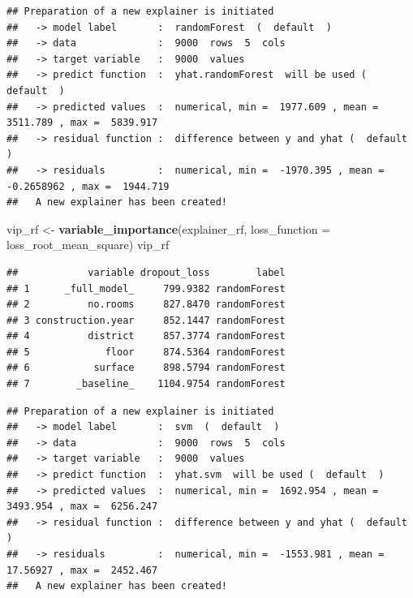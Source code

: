 \documentclass[12pt,]{krantz}
\newenvironment{Shaded}{\begin{snugshade}}{\end{snugshade}}
\newcommand{\DataTypeTok}[1]{\textcolor[rgb]{0.13,0.29,0.53}{#1}}
\newcommand{\DecValTok}[1]{\textcolor[rgb]{0.00,0.00,0.81}{#1}}
\newcommand{\KeywordTok}[1]{\textcolor[rgb]{0.13,0.29,0.53}{\textbf{#1}}}
\newcommand{\NormalTok}[1]{#1}
\newcommand{\OperatorTok}[1]{\textcolor[rgb]{0.81,0.36,0.00}{\textbf{#1}}}
\newcommand{\OtherTok}[1]{\textcolor[rgb]{0.56,0.35,0.01}{#1}}
\newcommand{\StringTok}[1]{\textcolor[rgb]{0.31,0.60,0.02}{#1}}
\begin{document}
\begin{verbatim}
## Preparation of a new explainer is initiated
##   -> model label       :  randomForest  (  default  )
##   -> data              :  9000  rows  5  cols 
##   -> target variable   :  9000  values 
##   -> predict function  :  yhat.randomForest  will be used (  default  )
##   -> predicted values  :  numerical, min =  1977.609 , mean =  3511.789 , max =  5839.917  
##   -> residual function :  difference between y and yhat (  default  )
##   -> residuals         :  numerical, min =  -1970.395 , mean =  -0.2658962 , max =  1944.719  
##   A new explainer has been created!
\end{verbatim}

\begin{Shaded}
\begin{Highlighting}[]
\NormalTok{vip_rf <-}\StringTok{ }\KeywordTok{variable_importance}\NormalTok{(explainer_rf, }
            \DataTypeTok{loss_function =}\NormalTok{ loss_root_mean_square)}
\NormalTok{vip_rf}
\end{Highlighting}
\end{Shaded}

\begin{verbatim}
##            variable dropout_loss        label
## 1      _full_model_     799.9382 randomForest
## 2          no.rooms     827.8470 randomForest
## 3 construction.year     852.1447 randomForest
## 4          district     857.3774 randomForest
## 5             floor     874.5364 randomForest
## 6           surface     898.5794 randomForest
## 7        _baseline_    1104.9754 randomForest
\end{verbatim}

\begin{Shaded}
\end{Shaded}

\begin{verbatim}
## Preparation of a new explainer is initiated
##   -> model label       :  svm  (  default  )
##   -> data              :  9000  rows  5  cols 
##   -> target variable   :  9000  values 
##   -> predict function  :  yhat.svm  will be used (  default  )
##   -> predicted values  :  numerical, min =  1692.954 , mean =  3493.954 , max =  6256.247  
##   -> residual function :  difference between y and yhat (  default  )
##   -> residuals         :  numerical, min =  -1553.981 , mean =  17.56927 , max =  2452.467  
##   A new explainer has been created!
\end{verbatim}
\end{document}

